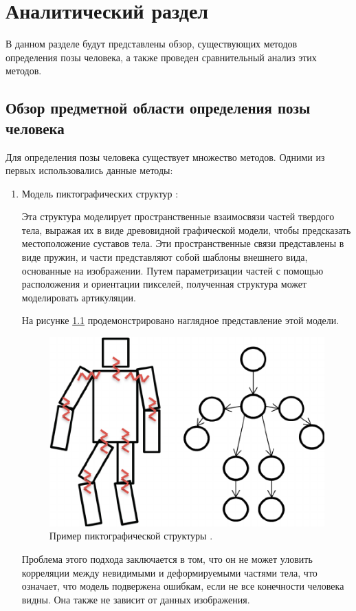 
\chapter{Аналитический раздел}

В данном разделе будут представлены обзор, существующих методов определения позы человека, а также проведен сравнительный анализ этих методов.

\section{Обзор предметной области определения позы человека}

Для определения позы человека существует множество методов. Одними из первых использовались данные методы: 
\begin{enumerate}[label=\arabic*)]
 	\item Модель пиктографических структур \cite{polygraphic}:
 	
 		Эта структура моделирует пространственные взаимосвязи частей твердого тела, выражая их в виде древовидной графической модели, чтобы предсказать местоположение суставов тела. 
 		Эти пространственные связи представлены в виде пружин, и части представляют собой шаблоны внешнего вида, основанные на изображении. 
 		Путем параметризации частей с помощью расположения и ориентации пикселей, полученная структура может моделировать артикуляции. 
 		
 		На рисунке \ref{img:polygraphic} продемонстрировано наглядное представление этой модели.
 		\begin{figure}[ht!]
 			\centering
 			\includegraphics[width=0.4\linewidth]{assets/pictographical.png}
 			\caption{Пример пиктографической структуры \cite{Pictographical}.}
 			\label{img:polygraphic}
 		\end{figure}
 		
 		
 		Проблема этого подхода заключается в том, что он не может уловить корреляции между невидимыми и деформируемыми частями тела, что означает, что модель подвержена ошибкам, если не все конечности человека видны. 
 		Она также не зависит от данных изображения.
 		


\end{enumerate}
